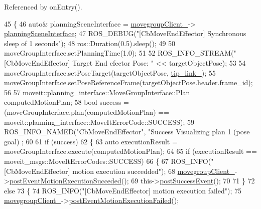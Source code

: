 Referenced by on\+Entry().


\begin{DoxyCode}
45 \{
46   \textcolor{keyword}{auto}& planningSceneInterface = \hyperlink{classmove__group__interface__client_1_1CbMoveEndEffector_aec44abef326949b57872d68e7b495194}{movegroupClient\_}->
      \hyperlink{classmove__group__interface__client_1_1ClMoveGroup_a401213ca52233581d2a659dbb772720c}{planningSceneInterface};
47   ROS\_DEBUG(\textcolor{stringliteral}{"[CbMoveEndEffector] Synchronous sleep of 1 seconds"});
48   ros::Duration(0.5).sleep();
49 
50   moveGroupInterface.setPlanningTime(1.0);
51 
52   ROS\_INFO\_STREAM(\textcolor{stringliteral}{"[CbMoveEndEffector] Target End efector Pose: "} << targetObjectPose);
53 
54   moveGroupInterface.setPoseTarget(targetObjectPose, \hyperlink{classmove__group__interface__client_1_1CbMoveEndEffector_a26d35b0beeb0476a62a46b9b9d659251}{tip\_link\_});
55   moveGroupInterface.setPoseReferenceFrame(targetObjectPose.header.frame\_id);
56 
57   moveit::planning\_interface::MoveGroupInterface::Plan computedMotionPlan;
58   \textcolor{keywordtype}{bool} success = (moveGroupInterface.plan(computedMotionPlan) == 
      moveit::planning\_interface::MoveItErrorCode::SUCCESS);
59   ROS\_INFO\_NAMED(\textcolor{stringliteral}{"CbMoveEndEffector"}, \textcolor{stringliteral}{"Success Visualizing plan 1 (pose goal) %
      ;
60 
61   \textcolor{keywordflow}{if} (success)
62   \{
63     \textcolor{keyword}{auto} executionResult = moveGroupInterface.execute(computedMotionPlan);
64 
65     \textcolor{keywordflow}{if} (executionResult == moveit\_msgs::MoveItErrorCodes::SUCCESS)
66     \{
67       ROS\_INFO(\textcolor{stringliteral}{"[CbMoveEndEffector] motion execution succedded"});
68       \hyperlink{classmove__group__interface__client_1_1CbMoveEndEffector_aec44abef326949b57872d68e7b495194}{movegroupClient\_}->\hyperlink{classmove__group__interface__client_1_1ClMoveGroup_a1b617e0018790b8ebf23aea75eb7acba}{postEventMotionExecutionSucceded}();
69       this->\hyperlink{classsmacc_1_1SmaccAsyncClientBehavior_adf18efe1f0e4eacc1277b8865a8a94b1}{postSuccessEvent}();
70 
71     \}
72     \textcolor{keywordflow}{else}
73     \{
74       ROS\_INFO(\textcolor{stringliteral}{"[CbMoveEndEffector] motion execution failed"});
75       \hyperlink{classmove__group__interface__client_1_1CbMoveEndEffector_aec44abef326949b57872d68e7b495194}{movegroupClient\_}->\hyperlink{classmove__group__interface__client_1_1ClMoveGroup_a41c0eebdb446e6fbdd17113524c34869}{postEventMotionExecutionFailed}();
}
\end{DoxyCode}
